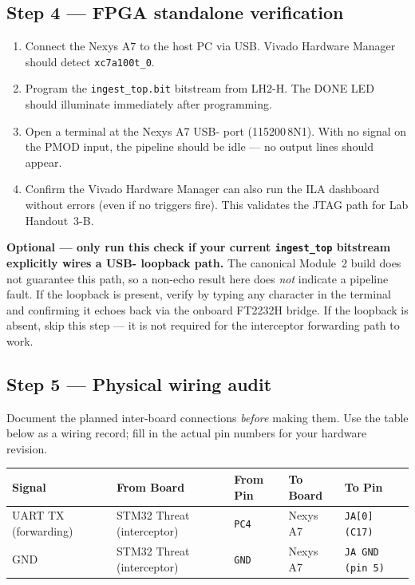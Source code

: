 \documentclass[11pt,letterpaper]{article}
\begin{document}
\subsection{Step 4 --- FPGA standalone verification}
\begin{enumerate}[leftmargin=2em]
	\item Connect the Nexys A7 to the host PC via USB. Vivado Hardware Manager should detect \texttt{xc7a100t\_0}.
	\item Program the \texttt{ingest\_top.bit} bitstream from LH2-H. The \mbox{DONE} \mbox{LED} should illuminate immediately after programming.
	\item Open a terminal at the Nexys A7 USB-\UART{} port (115200\,8N1). With no signal on the \mbox{PMOD} input, the pipeline should be idle --- no output lines should appear.
	\item Confirm the Vivado Hardware Manager can also run the \mbox{ILA} dashboard without errors (even if no triggers fire). This validates the \mbox{JTAG} path for Lab Handout~3-B.
\end{enumerate}

\begin{tcolorbox}[infobox={FPGA UART Loopback Test (Optional / Diagnostic)}]
	\textbf{Optional --- only run this check if your current \texttt{ingest\_top} bitstream explicitly wires a USB-\UART{} loopback path.} The canonical Module~2 build does not guarantee this path, so a non-echo result here does \emph{not} indicate a pipeline fault. If the loopback is present, verify by typing any character in the terminal and confirming it echoes back via the onboard FT2232H bridge. If the loopback is absent, skip this step --- it is not required for the interceptor forwarding path to work.
\end{tcolorbox}

\newpage
\subsection{Step 5 --- Physical wiring audit}
Document the planned inter-board connections \emph{before} making them. Use the table below as a wiring record; fill in the actual pin numbers for your hardware revision.

\begin{table}[h!]
	\centering
	\begin{tabularx}{\textwidth}{l l l l X}
		\toprule
		\textbf{Signal} & \textbf{From Board} & \textbf{From Pin} & \textbf{To Board} & \textbf{To Pin} \\
		\midrule
		UART TX (forwarding) & STM32 Threat (interceptor) & \texttt{PC4} & Nexys A7 & \texttt{JA[0] (C17)} \\
		GND & STM32 Threat (interceptor) & \texttt{GND} & Nexys A7 & \texttt{JA GND (pin 5)} \\
		\bottomrule
	\end{tabularx}
\end{table}
\end{document}
